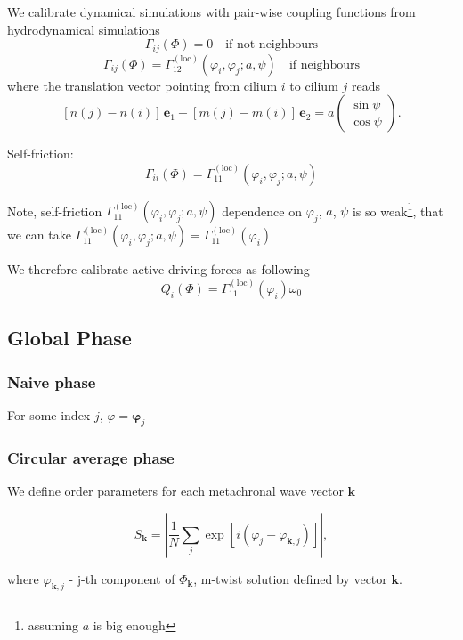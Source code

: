 \documentclass[a4paper,12pt]{article}
\begin{document}
We calibrate dynamical simulations with pair-wise coupling functions from hydrodynamical simulations
$$ \Gamma_{ij}(\Phi) = 0 \quad \text{if not neighbours} $$
$$ \Gamma_{ij}(\Phi) = \Gamma_{12}^{\mathrm{(loc)}}(\varphi_i,\varphi_j; a, \psi) \quad \text{if neighbours} $$
where the translation vector pointing from cilium $i$ to cilium $j$ reads
$$[n(j)-n(i)]\,\mathbf{e}_1 + [m(j)-m(i)]\,\mathbf{e}_2 = a \left( \begin{array}{c} \sin\psi \\ \cos\psi \end{array} \right).$$

Self-friction:
$$ \Gamma_{ii}(\Phi) = \Gamma_{11}^{\mathrm{(loc)}}(\varphi_i, \varphi_j; a, \psi) $$

Note, self-friction $\Gamma_{11}^{\mathrm{(loc)}}(\varphi_i, \varphi_j; a, \psi) $ dependence on $\varphi_j$, $a$, $\psi$ is so weak\footnote{assuming $a$ is big enough}, that we can take
$\Gamma_{11}^{\mathrm{(loc)}}(\varphi_i, \varphi_j; a, \psi)= \Gamma_{11}^{\mathrm{(loc)}}(\varphi_i)$

We therefore calibrate active driving forces as following
$$ Q_{i}(\Phi) = \Gamma_{11}^{\mathrm{(loc)}}(\varphi_i) \omega_0 $$


\subsection{Global Phase}

\subsubsection{Naive phase}
For some index $j$, $\varphi = \mathbf{\varphi}_j$

\subsubsection{Circular average phase}

We define order parameters
for each metachronal wave vector $\mathbf{k}$

$$S_\mathbf{k} = \left| \frac{1}{N}\sum_j \exp\left[ i ( \varphi_j - \varphi_{\mathbf{k},j} ) \right] \right|,$$

where $\varphi_{\mathbf{k},j}$ - j-th component of $\Phi_\mathbf{k}$, m-twist solution defined by vector $\mathbf{k}$.
\end{document}
